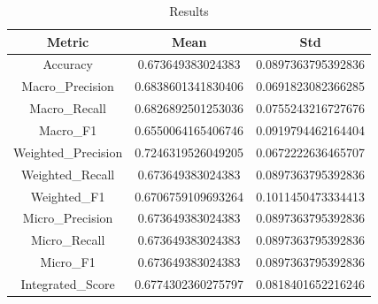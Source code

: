\begin{table}[htbp]
\centering
\caption{Results}
\label{tab:csv}
\small
\setlength{\tabcolsep}{4pt}
\begin{tabular}{|c|c|c|}
\hline
Metric & Mean & Std \\
\hline
Accuracy & 0.673649383024383 & 0.0897363795392836 \\
Macro_Precision & 0.6838601341830406 & 0.0691823082366285 \\
Macro_Recall & 0.6826892501253036 & 0.0755243216727676 \\
Macro_F1 & 0.6550064165406746 & 0.0919794462164404 \\
Weighted_Precision & 0.7246319526049205 & 0.0672222636465707 \\
Weighted_Recall & 0.673649383024383 & 0.0897363795392836 \\
Weighted_F1 & 0.6706759109693264 & 0.1011450473334413 \\
Micro_Precision & 0.673649383024383 & 0.0897363795392836 \\
Micro_Recall & 0.673649383024383 & 0.0897363795392836 \\
Micro_F1 & 0.673649383024383 & 0.0897363795392836 \\
Integrated_Score & 0.6774302360275797 & 0.0818401652216246 \\
\hline
\end{tabular}
\end{table}